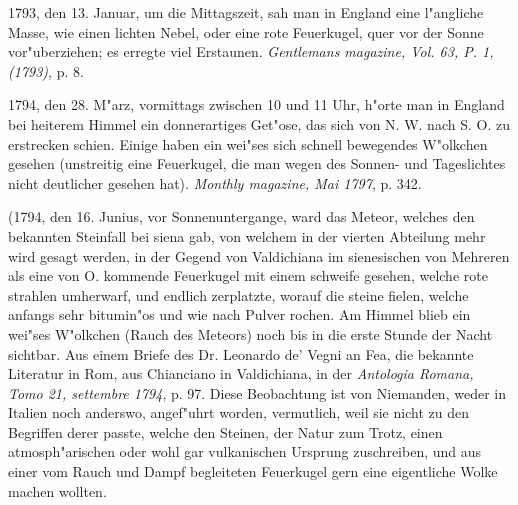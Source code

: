 \documentclass[a4paper, 11pt, oneside, polutonikogreek, german]{article}
\begin{document}
1793, den 13. Januar, um die Mittagszeit, sah man in England eine l"angliche Masse, wie einen lichten Nebel, oder eine rote Feuerkugel, quer vor der Sonne vor"uberziehen; es erregte viel Erstaunen. \emph{Gentlemans magazine, Vol. 63, P. 1, (1793)}, p. 8.

1794, den 28. M"arz, vormittags zwischen 10 und 11 Uhr, h"orte man in England bei heiterem Himmel ein donnerartiges Get"ose, das sich von N. W. nach S. O. zu erstrecken schien. Einige haben ein wei"ses sich schnell bewegendes W"olkchen gesehen (unstreitig eine Feuerkugel, die man wegen des Sonnen- und Tageslichtes nicht deutlicher gesehen hat). \emph{Monthly magazine, Mai 1797}, p. 342.

(1794, den 16. Junius, vor Sonnenuntergange, ward das Meteor, welches den bekannten Steinfall bei siena gab, von welchem in der vierten Abteilung mehr wird gesagt werden, in der Gegend von Valdichiana im sienesischen von Mehreren als eine von O. kommende Feuerkugel mit einem schweife gesehen, welche rote strahlen umherwarf, und endlich zerplatzte, worauf die steine fielen, welche anfangs sehr bitumin"os und wie nach Pulver rochen. Am Himmel blieb ein wei"ses W"olkchen (Rauch des Meteors) noch bis in die erste Stunde der Nacht sichtbar. Aus einem Briefe des Dr. Leonardo de' Vegni an Fea, die bekannte Literatur in Rom, aus Chianciano in Valdichiana, in der \emph{Antologia Romana, Tomo 21, settembre 1794}, p. 97. Diese Beobachtung ist von Niemanden, weder in Italien noch anderswo, angef"uhrt worden, vermutlich, weil sie nicht zu den Begriffen derer passte, welche den Steinen, der Natur zum Trotz, einen atmosph"arischen oder wohl gar vulkanischen Ursprung zuschreiben, und aus einer vom Rauch und Dampf begleiteten Feuerkugel gern eine eigentliche Wolke machen wollten.
\end{document}
